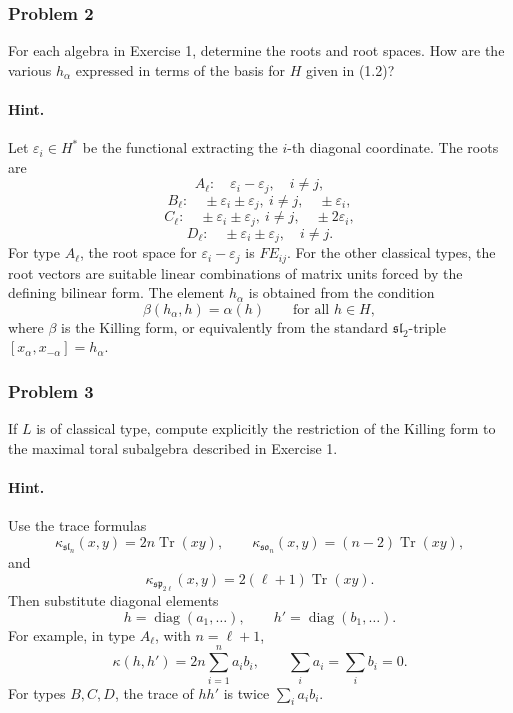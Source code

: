 \documentclass[12pt, a4paper]{article}
\begin{document}
\subsubsection{Problem 2}

For each algebra in Exercise 1, determine the roots and root spaces. How are
the various \(h_\alpha\) expressed in terms of the basis for \(H\) given in
(1.2)?

\paragraph{Hint.}
Let \(\varepsilon_i\in H^*\) be the functional extracting the \(i\)-th diagonal
coordinate. The roots are
\[
A_\ell:\quad \varepsilon_i-\varepsilon_j,\quad i\neq j,
\]
\[
B_\ell:\quad \pm \varepsilon_i\pm \varepsilon_j,\ i\neq j,\quad
\pm\varepsilon_i,
\]
\[
C_\ell:\quad \pm \varepsilon_i\pm \varepsilon_j,\ i\neq j,\quad
\pm 2\varepsilon_i,
\]
\[
D_\ell:\quad \pm \varepsilon_i\pm \varepsilon_j,\quad i\neq j.
\]
For type \(A_\ell\), the root space for \(\varepsilon_i-\varepsilon_j\) is
\(F E_{ij}\). For the other classical types, the root vectors are suitable
linear combinations of matrix units forced by the defining bilinear form. The
element \(h_\alpha\) is obtained from the condition
\[
\beta(h_\alpha,h)=\alpha(h)
\qquad \text{for all } h\in H,
\]
where \(\beta\) is the Killing form, or equivalently from the standard
\(\mathfrak{sl}_2\)-triple \([x_\alpha,x_{-\alpha}]=h_\alpha\).

\subsubsection{Problem 3}

If \(L\) is of classical type, compute explicitly the restriction of the
Killing form to the maximal toral subalgebra described in Exercise 1.

\paragraph{Hint.}
Use the trace formulas
\[
\kappa_{\mathfrak{sl}_n}(x,y)=2n\operatorname{Tr}(xy),
\qquad
\kappa_{\mathfrak{so}_n}(x,y)=(n-2)\operatorname{Tr}(xy),
\]
and
\[
\kappa_{\mathfrak{sp}_{2\ell}}(x,y)=2(\ell+1)\operatorname{Tr}(xy).
\]
Then substitute diagonal elements
\[
h=\operatorname{diag}(a_1,\ldots),\qquad
h'=\operatorname{diag}(b_1,\ldots).
\]
For example, in type \(A_\ell\), with \(n=\ell+1\),
\[
\kappa(h,h')=2n\sum_{i=1}^n a_i b_i,
\qquad \sum_i a_i=\sum_i b_i=0.
\]
For types \(B,C,D\), the trace of \(hh'\) is twice \(\sum_i a_i b_i\).
\end{document}
